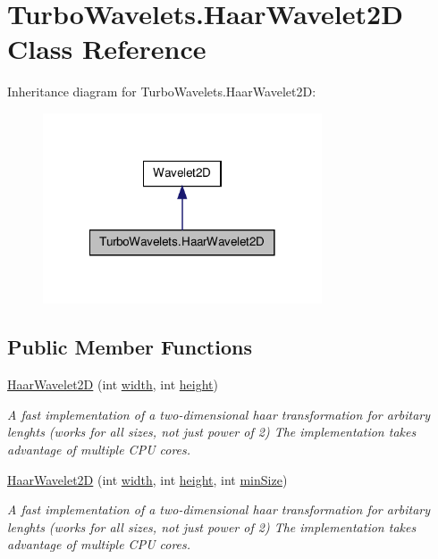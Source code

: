 \hypertarget{class_turbo_wavelets_1_1_haar_wavelet2_d}{\section{\-Turbo\-Wavelets.\-Haar\-Wavelet2\-D \-Class \-Reference}
\label{class_turbo_wavelets_1_1_haar_wavelet2_d}
}


\-Inheritance diagram for \-Turbo\-Wavelets.\-Haar\-Wavelet2\-D\-:
\nopagebreak
\begin{figure}[H]
\begin{center}
\leavevmode
\includegraphics[width=234pt]{class_turbo_wavelets_1_1_haar_wavelet2_d__inherit__graph}
\end{center}
\end{figure}
\subsection*{\-Public \-Member \-Functions}
\begin{DoxyCompactItemize}
\item 
\hyperlink{class_turbo_wavelets_1_1_haar_wavelet2_d_ab55a20658fe1f22b6e756418b4e1dc29}{\-Haar\-Wavelet2\-D} (int \hyperlink{class_turbo_wavelets_1_1_wavelet2_d_aaa4b3711957fe1798980e6891331a08d}{width}, int \hyperlink{class_turbo_wavelets_1_1_wavelet2_d_afb2aa87b89b82f329357cbdc0cde18a8}{height})
\begin{DoxyCompactList}\small\item\em \-A fast implementation of a two-\/dimensional haar transformation for arbitary lenghts (works for all sizes, not just power of 2) \-The implementation takes advantage of multiple \-C\-P\-U cores. \end{DoxyCompactList}\item 
\hyperlink{class_turbo_wavelets_1_1_haar_wavelet2_d_a8064166eec2c0a4b66378896b882bd47}{\-Haar\-Wavelet2\-D} (int \hyperlink{class_turbo_wavelets_1_1_wavelet2_d_aaa4b3711957fe1798980e6891331a08d}{width}, int \hyperlink{class_turbo_wavelets_1_1_wavelet2_d_afb2aa87b89b82f329357cbdc0cde18a8}{height}, int \hyperlink{class_turbo_wavelets_1_1_wavelet2_d_af5148ef1a46dd5694ccea13aa8f1b9e2}{min\-Size})
\begin{DoxyCompactList}\small\item\em \-A fast implementation of a two-\/dimensional haar transformation for arbitary lenghts (works for all sizes, not just power of 2) \-The implementation takes advantage of multiple \-C\-P\-U cores. \end{DoxyCompactList}\end{DoxyCompactItemize}
